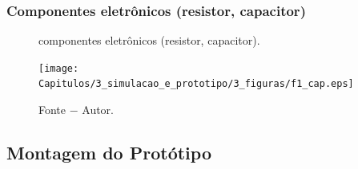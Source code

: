\subsubsection{Componentes eletrônicos (resistor, capacitor)}

\begin{figure}[!h]
	\centering
	\caption{componentes eletrônicos (resistor, capacitor).}
	\texttt{[image: Capitulos/3\_simulacao\_e\_prototipo/3\_figuras/f1\_cap.eps]}
	\caption*{Fonte $-$ Autor.}
	\label{fig3:image_09}
\end{figure}



\subsection{Montagem do Protótipo}